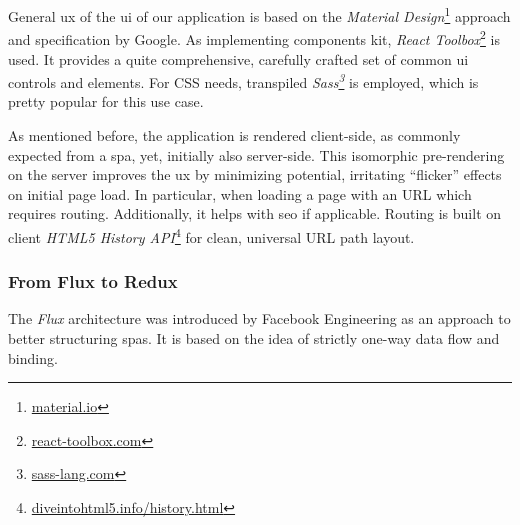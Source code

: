 General \gls{ux} of the \gls{ui} of our application is based on the \emph{Material Design}\footnote{\textcolor{blue}{\href{https://material.io/}{material.io}}} approach and specification by Google.
As implementing components kit, \emph{React Toolbox}\footnote{\textcolor{blue}{\href{http://react-toolbox.com/}{react-toolbox.com}}} is used. It provides a quite comprehensive, carefully crafted set of common \gls{ui} controls and elements.
For \textsc{CSS} needs, transpiled \emph{Sass\footnote{\textcolor{blue}{\href{http://sass-lang.com/}{sass-lang.com}}}} is employed, which is pretty popular for this use case.

As mentioned before, the application is rendered client-side, as commonly expected from a \gls{spa}, yet, initially also server-side.
This isomorphic pre-rendering on the server improves the \gls{ux} by minimizing potential, irritating ``flicker'' effects on initial page load.
In particular, when loading a page with an URL which requires routing.
Additionally, it helps with \gls{seo} if applicable.
Routing is built on client \emph{HTML5 History API}\footnote{\textcolor{blue}{\href{http://diveintohtml5.info/history.html}{diveintohtml5.info/history.html}}} for clean, universal URL path layout.

\subsubsection{From Flux to Redux}

The \emph{Flux} architecture was introduced by Facebook Engineering as an approach to better structuring \gls{spa}s.
It is based on the idea of strictly one-way data flow and binding.


